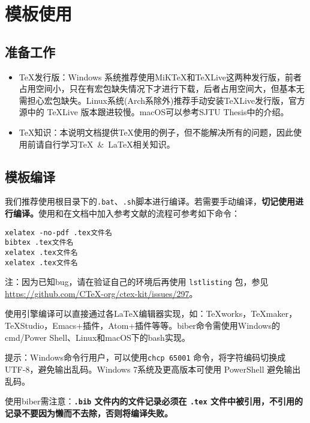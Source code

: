 \section{模板使用}
\subsection{准备工作}
\begin{itemize}
  \item \TeX 发行版：Windows 系统推荐使用MiK\TeX 和\TeX Live这两种发行版，前者占用空间小，只在有宏包缺失情况下才进行下载，后者占用空间大，但基本无需担心宏包缺失。Linux系统(Arch系除外)推荐手动安装\TeX Live发行版，官方源中的 \TeX Live 版本跟进较慢。macOS可以参考SJTU Thesis中的介绍。
  \item \TeX 知识：本说明文档提供\TeX 使用的例子，但不能解决所有的问题，因此使用前请自行学习\TeX~\&~\LaTeX 相关知识。
\end{itemize}

\subsection{模板编译}

我们推荐使用根目录下的\verb|.bat|、\verb|.sh|脚本进行编译。若需要手动编译，\textbf{切记使用\XeLaTeX 进行编译。}使用\XeLaTeX 和在文档中加入参考文献的流程可参考如下命令：

\iffalse
\begin{lstlisting}[basicstyle=\small\ttfamily, caption=手动逐次编译, numbers=none]
xelatex -no-pdf .tex文件名
bibtex .tex文件名
xelatex .tex文件名
xelatex .tex文件名
\end{lstlisting}
\else
\begin{verbatim}
xelatex -no-pdf .tex文件名
bibtex .tex文件名
xelatex .tex文件名
xelatex .tex文件名
\end{verbatim}

注：因为已知bug，请在验证自己的环境后再使用 \texttt{lstlisting} 包，参见\url{https://github.com/CTeX-org/ctex-kit/issues/297}。

\fi

使用\XeLaTeX 引擎编译可以直接通过各\LaTeX 编辑器实现，如：TeXworks，TeXmaker，TeXStudio，Emacs+插件，Atom+插件等等。biber命令需使用Windows的cmd/Power Shell、Linux和macOS下的bash实现。

提示：Windows命令行用户，可以使用\verb|chcp 65001| 命令，将字符编码切换成 UTF-8，避免输出乱码。Windows 7系统及更高版本可使用 PowerShell 避免输出乱码。

使用biber需注意：\textbf{\texttt{.bib} 文件内的文件记录必须在 \texttt{.tex} 文件中被引用，不引用的记录不要因为懒而不去除，否则将编译失败。}

